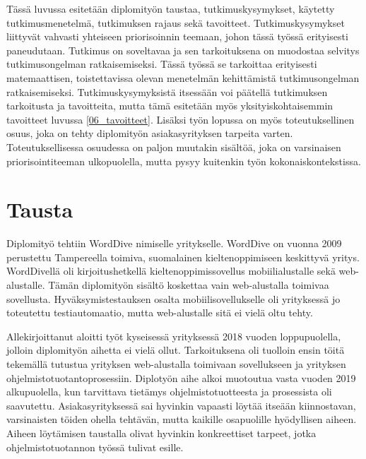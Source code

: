 Tässä luvussa esitetään diplomityön taustaa, tutkimuskysymykset, käytetty tutkimusmenetelmä, tutkimuksen rajaus sekä tavoitteet.
Tutkimuskysymykset liittyvät vahvasti yhteiseen priorisoinnin teemaan, johon tässä työssä erityisesti paneudutaan.
Tutkimus on soveltavaa ja sen tarkoituksena on muodostaa selvitys tutkimusongelman ratkaisemiseksi.
Tässä työssä se tarkoittaa erityisesti matemaattisen, toistettavissa olevan menetelmän kehittämistä tutkimusongelman ratkaisemiseksi.
Tutkimuskysymyksistä itsessään voi päätellä tutkimuksen tarkoitusta ja tavoitteita, mutta tämä esitetään myös yksityiskohtaisemmin tavoitteet luvussa \ref{06_tavoitteet}.
Lisäksi työn lopussa on myös toteutuksellinen osuus, joka on tehty diplomityön asiakasyrityksen tarpeita varten.
Toteutuksellisessa osuudessa on paljon muutakin sisältöä, joka on varsinaisen priorisointiteeman ulkopuolella, mutta pysyy kuitenkin työn kokonaiskontekstissa.

\section{Tausta} \label{06_tausta}

Diplomityö tehtiin WordDive nimiselle yritykselle. WordDive on vuonna 2009 perustettu Tampereella toimiva, suomalainen kieltenoppimiseen keskittyvä yritys. WordDivellä oli kirjoitushetkellä kieltenoppimissovellus mobiilialustalle sekä web-alustalle.
Tämän diplomityön sisältö koskettaa vain web-alustalla toimivaa sovellusta.
Hyväksymistestauksen osalta mobiilisovellukselle oli yrityksessä jo toteutettu testiautomaatio, mutta web-alustalle sitä ei vielä oltu tehty.

Allekirjoittanut aloitti työt kyseisessä yrityksessä 2018 vuoden loppupuolella, jolloin diplomityön aihetta ei vielä ollut.
Tarkoituksena oli tuolloin ensin töitä tekemällä tutustua yrityksen web-alustalla toimivaan sovellukseen ja yrityksen ohjelmistotuotantoprosessiin.
Diplotyön aihe alkoi muotoutua vasta vuoden 2019 alkupuolella, kun tarvittava tietämys ohjelmistotuotteesta ja prosessista oli saavutettu.
Asiakasyrityksessä sai hyvinkin vapaasti löytää itseään kiinnostavan, varsinaisten töiden ohella tehtävän, mutta kaikille osapuolille hyödyllisen aiheen.
Aiheen löytämisen taustalla olivat hyvinkin konkreettiset tarpeet, jotka ohjelmistotuotannon työssä tulivat esille.

